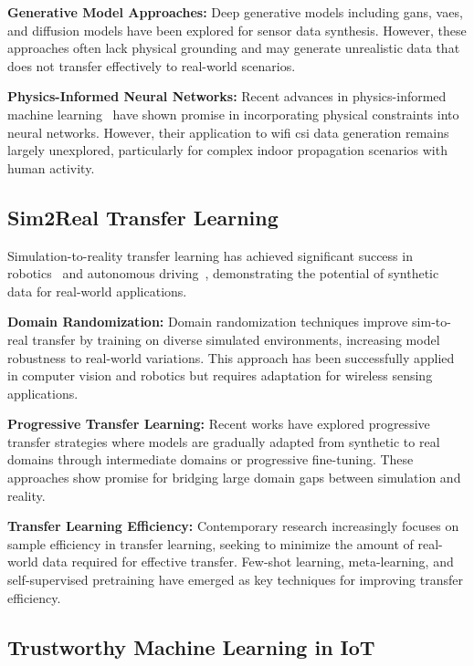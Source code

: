 \documentclass[journal]{IEEEtran}
\begin{document}
\textbf{Generative Model Approaches:} Deep generative models including \glspl{gan}, \glspl{vae}, and diffusion models have been explored for sensor data synthesis. However, these approaches often lack physical grounding and may generate unrealistic data that does not transfer effectively to real-world scenarios.

\textbf{Physics-Informed Neural Networks:} Recent advances in physics-informed machine learning~\cite{pinn_karniadakis2021} have shown promise in incorporating physical constraints into neural networks. However, their application to \gls{wifi} \gls{csi} data generation remains largely unexplored, particularly for complex indoor propagation scenarios with human activity.

\subsection{Sim2Real Transfer Learning}

Simulation-to-reality transfer learning has achieved significant success in robotics~\cite{sim2real_robotics2017} and autonomous driving~\cite{sim2real_autonomous2019}, demonstrating the potential of synthetic data for real-world applications.

\textbf{Domain Randomization:} Domain randomization techniques improve sim-to-real transfer by training on diverse simulated environments, increasing model robustness to real-world variations. This approach has been successfully applied in computer vision and robotics but requires adaptation for wireless sensing applications.

\textbf{Progressive Transfer Learning:} Recent works have explored progressive transfer strategies where models are gradually adapted from synthetic to real domains through intermediate domains or progressive fine-tuning. These approaches show promise for bridging large domain gaps between simulation and reality.

\textbf{Transfer Learning Efficiency:} Contemporary research increasingly focuses on sample efficiency in transfer learning, seeking to minimize the amount of real-world data required for effective transfer. Few-shot learning, meta-learning, and self-supervised pretraining have emerged as key techniques for improving transfer efficiency.

\subsection{Trustworthy Machine Learning in IoT}
\end{document}
